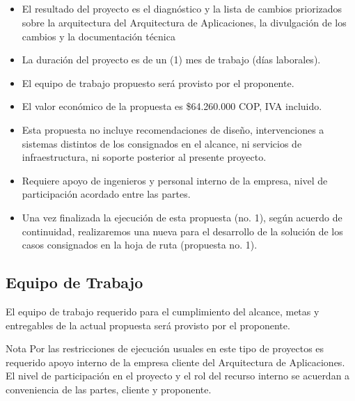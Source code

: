 \documentclass[
	a4paper, %
	12pt, %
]{include/CSSullivanBusinessReport}
\def\tightlist{}
\begin{document}
\subsection{}\label{sec:section}

\begin{quote}
\end{quote}

\begin{itemize}
\tightlist
\item
  El resultado del proyecto es el diagnóstico y la lista de cambios
  priorizados sobre la arquitectura del Arquitectura de Aplicaciones, la
  divulgación de los cambios y la documentación técnica
\item
  La duración del proyecto es de un (1) mes de trabajo (días laborales).
\item
  El equipo de trabajo propuesto será provisto por el proponente.
\item
  El valor económico de la propuesta es \$64.260.000 COP, IVA incluido.
\item
  Esta propuesta no incluye recomendaciones de diseño, intervenciones a
  sistemas distintos de los consignados en el alcance, ni servicios de
  infraestructura, ni soporte posterior al presente proyecto.
\item
  Requiere apoyo de ingenieros y personal interno de la empresa, nivel
  de participación acordado entre las partes.
\item
  Una vez finalizada la ejecución de esta propuesta (no. 1), según
  acuerdo de continuidad, realizaremos una nueva para el desarrollo de
  la solución de los casos consignados en la hoja de ruta (propuesta no.
  1).
\end{itemize}

\subsection{Equipo de Trabajo}\label{sec:equipo-de-trabajo}

\begin{quote}
\end{quote}

El equipo de trabajo requerido para el cumplimiento del alcance, metas y
entregables de la actual propuesta será provisto por el proponente.

Nota Por las restricciones de ejecución usuales en este tipo de
proyectos es requerido apoyo interno de la empresa cliente del
Arquitectura de Aplicaciones. El nivel de participación en el proyecto y
el rol del recurso interno se acuerdan a conveniencia de las partes,
cliente y proponente.
\end{document}
